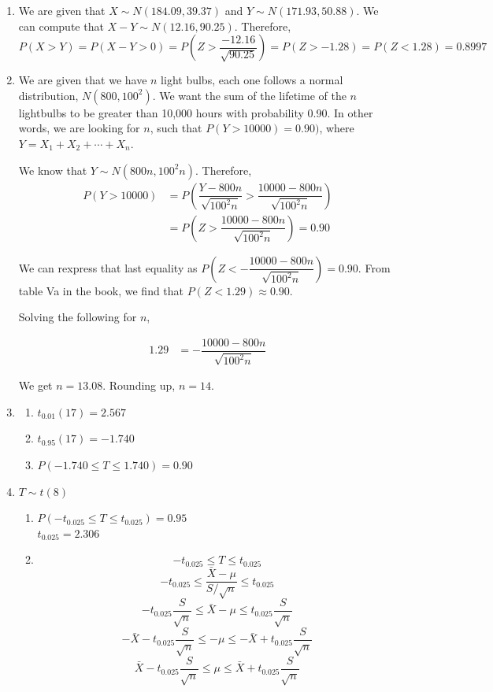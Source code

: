 \documentclass{article}
\newcommand\myskip[1]{\addtocounter{enumi}{#1}}
\begin{document}
\begin{enumerate}
      \item
	We are given that $X \sim N(184.09,39.37)$ and $Y \sim N(171.93,50.88)$. We can compute that
	$X - Y \sim N(12.16, 90.25)$. Therefore, $P(X > Y) = P(X - Y > 0) 
	  = P\left(Z > \dfrac{-12.16}{\sqrt{90.25}}\right) = P(Z > -1.28) = P(Z < 1.28) = 0.8997$
      \myskip{1}
      
      \item
	We are given that we have $n$ light bulbs, each one follows a normal distribution, $N(800, 100^2)$.
	We want the sum of the lifetime of the $n$ lightbulbs to be greater than 10,000 hours with 
	probability 0.90. In other words, we are looking for $n$, such that $P(Y > 10000) = 0.90)$, 
	where $Y = X_1 + X_2 + \cdots + X_n$. 
	
	We know that $Y \sim N(800n, 100^2n)$. Therefore, 
	\begin{align*}
	 P(Y > 10000) &= P\left(\dfrac{Y - 800n}{\sqrt{100^2n}} > \dfrac{10000 - 800n}{\sqrt{100^2n}}\right) \\
	  &= P\left(Z > \dfrac{10000 - 800n}{\sqrt{100^2n}}\right) = 0.90
	\end{align*}
	
	We can rexpress that last equality as $P\left(Z < -\dfrac{10000 - 800n}{\sqrt{100^2n}}\right) = 0.90$.
	From table Va in the book, we find that $P(Z < 1.29) \approx 0.90$. 
	
	Solving the following for $n$, 
	
	\begin{align*}
	 1.29 &= -\dfrac{10000 - 800n}{\sqrt{100^2n}}
	\end{align*}
	
	We get $n = 13.08$. Rounding up, $n=14$.
      \myskip{4}
      
      \item
	\begin{enumerate}
	 \item
	  $t_{0.01}(17) = 2.567$
	 
	 \item
	  $t_{0.95}(17) = -1.740$
	 
	 \item
	  $P(-1.740 \le T \le 1.740) = 0.90$
	\end{enumerate}
      
      \item
	$T \sim t(8)$
	\begin{enumerate}
	 \item 
	  $P(-t_{0.025} \le T \le t_{0.025}) = 0.95$ \\
	  $t_{0.025} = 2.306$
	 
	 \item
	  $$-t_{0.025} \le T \le t_{0.025}$$
	  $$-t_{0.025} \le \dfrac{\bar{X} - \mu}{S/\sqrt{n}} \le t_{0.025}$$
	  $$-t_{0.025}\dfrac{S}{\sqrt{n}} \le \bar{X} - \mu \le t_{0.025}\dfrac{S}{\sqrt{n}}$$
	  $$-\bar{X} - t_{0.025}\dfrac{S}{\sqrt{n}} \le -\mu \le -\bar{X} + t_{0.025}\dfrac{S}{\sqrt{n}}$$
	  $$\bar{X} - t_{0.025}\dfrac{S}{\sqrt{n}} \le \mu \le \bar{X} + t_{0.025}\dfrac{S}{\sqrt{n}}$$

	\end{enumerate}
    \end{enumerate}
    
\end{document}
